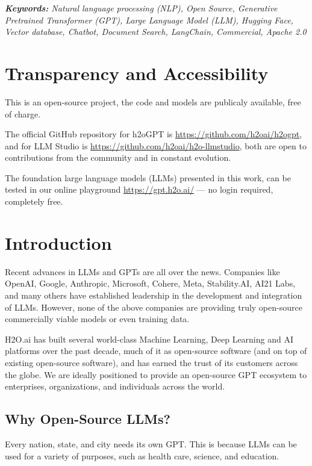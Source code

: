 \documentclass{article}
\begin{document}
\begin{adjustwidth}{37pt}{37pt}
\emph{\textbf{ Keywords:} Natural language processing (NLP), Open Source, Generative Pretrained Transformer (GPT), Large Language Model (LLM), Hugging Face, Vector database, Chatbot, Document Search, LangChain, Commercial, Apache 2.0}
\end{adjustwidth}

\clearpage

\tableofcontents

\vspace{8mm}
\section*{Transparency and Accessibility}
This is an open-source project, the code and models are publicaly available, free of charge. 

The official GitHub repository for h2oGPT is \url{https://github.com/h2oai/h2ogpt}, and for LLM Studio is \url{https://github.com/h2oai/h2o-llmstudio}, both are open to contributions from the community and in constant evolution.

The foundation large language models (LLMs) presented in this work, can be tested in our online playground \url{https://gpt.h2o.ai/} --- no login required, completely free.

\clearpage

\section{Introduction}
Recent advances in LLMs and GPTs are all over the news. Companies like OpenAI, Google, Anthropic, Microsoft, Cohere, Meta, Stability.AI, AI21 Labs, and many others have established leadership in the development and integration of LLMs. However, none of the above companies are providing truly open-source commercially viable models or even training data.


H2O.ai has built several world-class Machine Learning, Deep Learning and AI platforms over the past decade, much of it as open-source software (and on top of existing open-source software), and has earned the trust of its customers across the globe. We are ideally positioned to provide an open-source GPT ecosystem to enterprises, organizations, and individuals across the world.

\subsection{Why Open-Source LLMs?}
Every nation, state, and city needs its own GPT. This is because LLMs can be used for a variety of purposes, such as health care, science, and education.
\end{document}
